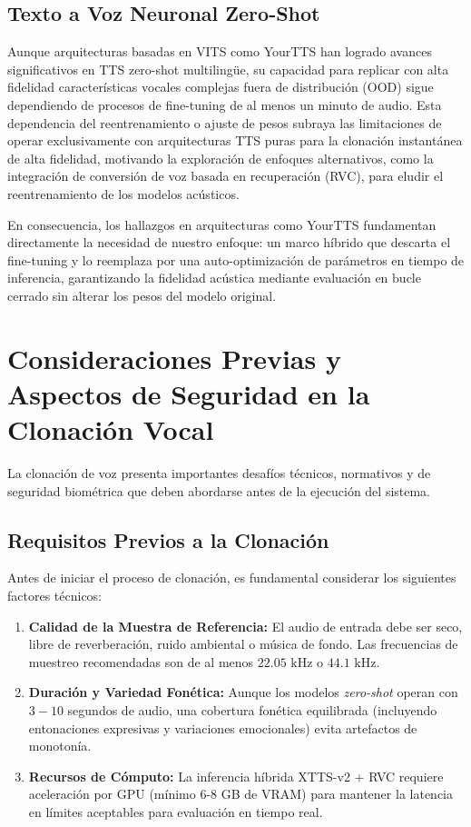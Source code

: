 \documentclass[conference]{IEEEtran}
\begin{document}
\subsection{Texto a Voz Neuronal Zero-Shot}

Aunque arquitecturas basadas en VITS como YourTTS \cite{casanova2022yourtts} han logrado avances significativos en TTS zero-shot multilingüe, su capacidad para replicar con alta fidelidad características vocales complejas fuera de distribución (OOD) sigue dependiendo de procesos de fine-tuning de al menos un minuto de audio. Esta dependencia del reentrenamiento o ajuste de pesos subraya las limitaciones de operar exclusivamente con arquitecturas TTS puras para la clonación instantánea de alta fidelidad, motivando la exploración de enfoques alternativos, como la integración de conversión de voz basada en recuperación (RVC), para eludir el reentrenamiento de los modelos acústicos.

En consecuencia, los hallazgos en arquitecturas como YourTTS fundamentan directamente la necesidad de nuestro enfoque: un marco híbrido que descarta el fine-tuning y lo reemplaza por una auto-optimización de parámetros en tiempo de inferencia, garantizando la fidelidad acústica mediante evaluación en bucle cerrado sin alterar los pesos del modelo original.

\section{Consideraciones Previas y Aspectos de Seguridad en la Clonación Vocal}
La clonación de voz presenta importantes desafíos técnicos, normativos y de seguridad biométrica que deben abordarse antes de la ejecución del sistema.

\subsection{Requisitos Previos a la Clonación}
Antes de iniciar el proceso de clonación, es fundamental considerar los siguientes factores técnicos:
\begin{enumerate}
	\item \textbf{Calidad de la Muestra de Referencia:} El audio de entrada debe ser seco, libre de reverberación, ruido ambiental o música de fondo. Las frecuencias de muestreo recomendadas son de al menos $22.05\text{ kHz}$ o $44.1\text{ kHz}$.
	\item \textbf{Duración y Variedad Fonética:} Aunque los modelos \emph{zero-shot} operan con $3-10$ segundos de audio, una cobertura fonética equilibrada (incluyendo entonaciones expresivas y variaciones emocionales) evita artefactos de monotonía.
	\item \textbf{Recursos de Cómputo:} La inferencia híbrida XTTS-v2 + RVC requiere aceleración por GPU (mínimo 6-8 GB de VRAM) para mantener la latencia en límites aceptables para evaluación en tiempo real.
\end{enumerate}
\end{document}

